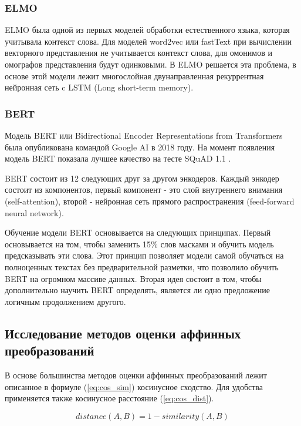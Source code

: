 \documentclass[a4paper,14pt]{article}
\begin{document}
	\subsubsection{ELMO}
	
	ELMO \cite{elmo} была одной из первых моделей обработки естественного языка, которая учитывала контекст слова.
	Для моделей word2vec или fastText при вычислении векторного представления не учитывается контекст слова, для омонимов и омографов представления будут одинковыми.
	В ELMO решается эта проблема, в основе этой модели лежит многослойная двунаправленная рекуррентная нейронная сеть c LSTM (Long short-term memory).
	
	\subsubsection{BERT}
	
	Модель BERT \cite{bert} или Bidirectional Encoder Representations from Transformers была опубликована командой Google AI в 2018 году.
	На момент появления модель BERT показала лучшее качество на тесте SQuAD 1.1 \cite{SQuAD}.
	
	BERT состоит из 12 следующих друг за другом энкодеров.
	Каждый энкодер состоит из компонентов, первый компонент - это слой внутреннего внимания (self-attention), второй - нейронная сеть прямого распространения (feed-forward neural network).
	
	Обучение модели BERT основывается на следующих принципах.	
	Первый основывается на том, чтобы заменить 15\% слов масками и обучить модель предсказывать эти слова.
	Этот принцип позволяет модели самой обучаться на полноценных текстах без предварительной разметки, что позволило обучить BERT на огромном массиве данных.
	Вторая идея состоит в том, чтобы дополнительно научить BERT определять, является ли одно предложение логичным продолжением другого.
	
	\subsection{Исследование методов оценки аффинных преобразований}
	
	В основе большинства методов оценки аффинных преобразований лежит описанное в формуле (\ref{eq:cos_sim}) косинусное сходство.
	Для удобства применяется также косинусное расстояние (\ref{eq:cos_dist}).
	
	\begin{equation}
		distance(A,B) = 1 - similarity(A,B)
		\label{eq:cos_dist}
	\end{equation}
\end{document}
